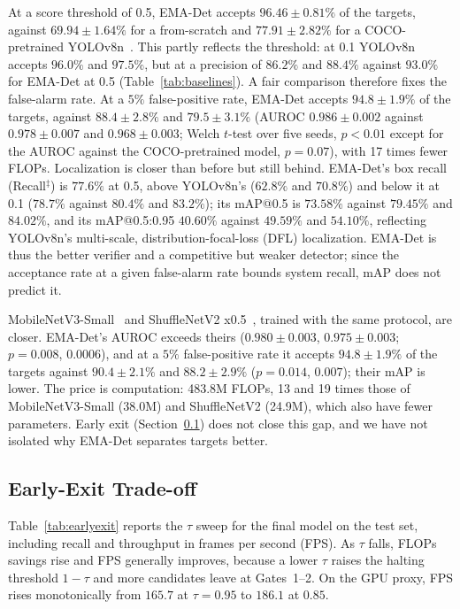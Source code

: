 \documentclass[pdflatex,sn-mathphys-num,iicol]{sn-jnl}%
\begin{document}
 At a score threshold of 0.5, EMA-Det accepts $96.46\pm0.81\%$ of the targets,
against $69.94\pm1.64\%$ for a from-scratch and $77.91\pm2.82\%$ for a
COCO-pretrained YOLOv8n~\cite{jocher2023yolov8}. This partly reflects the
threshold: at 0.1 YOLOv8n accepts $96.0\%$ and $97.5\%$, but at a precision of
$86.2\%$ and $88.4\%$ against $93.0\%$ for EMA-Det at 0.5 (Table~\ref{tab:baselines}).
A fair comparison therefore fixes the false-alarm rate. At a $5\%$
false-positive rate, EMA-Det accepts $94.8\pm1.9\%$ of the targets, against
$88.4\pm2.8\%$ and $79.5\pm3.1\%$ (AUROC $0.986\pm0.002$ against
$0.978\pm0.007$ and $0.968\pm0.003$; Welch $t$-test over five seeds, $p<0.01$
except for the AUROC against the COCO-pretrained model, $p=0.07$), with 17
times fewer FLOPs. Localization is closer than before but still behind. EMA-Det's
box recall (Recall$^{\ddagger}$) is $77.6\%$ at 0.5, above YOLOv8n's ($62.8\%$ and
$70.8\%$) and below it at 0.1 ($78.7\%$ against $80.4\%$ and $83.2\%$); its mAP@0.5
is $73.58\%$ against $79.45\%$ and $84.02\%$, and its mAP@0.5:0.95 $40.60\%$ against
$49.59\%$ and $54.10\%$, reflecting YOLOv8n's multi-scale,
distribution-focal-loss (DFL) localization. EMA-Det is thus the better verifier and
a competitive but weaker detector; since the acceptance rate at a given false-alarm
rate bounds system recall, mAP does not predict it.

 MobileNetV3-Small~\cite{howard2019mobilenetv3} and ShuffleNetV2
x0.5~\cite{ma2018shufflenet}, trained with the same protocol, are closer. EMA-Det's
AUROC exceeds theirs ($0.980\pm0.003$, $0.975\pm0.003$; $p=0.008$, $0.0006$), and at a
$5\%$ false-positive rate it accepts $94.8\pm1.9\%$ of the targets against $90.4\pm2.1\%$ and
$88.2\pm2.9\%$ ($p=0.014$, $0.007$); their mAP is lower. The price is computation:
483.8M FLOPs, 13 and 19 times those of MobileNetV3-Small (38.0M) and ShuffleNetV2
(24.9M), which also have fewer parameters. Early exit (Section~\ref{sec:earlyexit}) does not
close this gap, and we have not isolated why EMA-Det separates targets better.

\subsection{Early-Exit Trade-off}\label{sec:earlyexit}

Table~\ref{tab:earlyexit} reports the $\tau$ sweep for the final model on the
test set, including recall and throughput in frames per second (FPS). As $\tau$
falls, FLOPs savings rise and FPS generally improves, because a lower $\tau$
raises the halting threshold $1-\tau$ and more candidates leave at
Gates~1--2. On the GPU proxy, FPS rises monotonically from $165.7$ at $\tau{=}0.95$ to $186.1$ at $0.85$.
\end{document}
